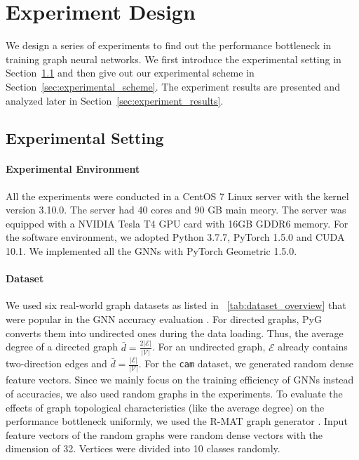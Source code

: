 \section{Experiment Design}
\label{sec:experimental_design}

We design a series of experiments to find out the performance bottleneck in training graph neural networks.
We first introduce the experimental setting in Section~\ref{sec:experimental_env} and then give out our experimental scheme in Section~\ref{sec:experimental_scheme}.
The experiment results are presented and analyzed later in Section~\ref{sec:experiment_results}.

\subsection{Experimental Setting}
\label{sec:experimental_env}

\paragraph{Experimental Environment}
All the experiments were conducted in a CentOS 7 Linux server with the kernel version 3.10.0.
The server had 40 cores and 90 GB main meory.
The server was equipped with a NVIDIA Tesla T4 GPU card with 16GB GDDR6 memory.
For the software environment, we adopted Python 3.7.7, PyTorch 1.5.0 and CUDA 10.1.
We implemented all the GNNs with PyTorch Geometric 1.5.0.

\paragraph{Dataset}
We used six real-world graph datasets as listed in \tablename~\ref{tab:dataset_overview} that were popular in the GNN accuracy evaluation \cite{yang2016_revisiting_semisupervised, zeng2020_graphsaint, shchur2018_pitfall_of_gnn}.
For directed graphs, PyG converts them into undirected ones during the data loading.
Thus, the average degree of a directed graph $\bar{d}=\frac{2|\mathcal{E}|}{|\mathcal{V}|}$.
For an undirected graph, $\mathcal{E}$ already contains two-direction edges and $\bar{d}=\frac{|\mathcal{E}|}{|\mathcal{V}|}$.
For the \texttt{cam} dataset, we generated random dense feature vectors.
Since we mainly focus on the training efficiency of GNNs instead of accuracies, we also used random graphs in the experiments.
To evaluate the effects of graph topological characteristics (like the average degree) on the performance bottleneck uniformly, we used the R-MAT graph generator \cite{rmat-generator}.
Input feature vectors of the random graphs were random dense vectors with the dimension of 32.
Vertices were divided into 10 classes randomly.

